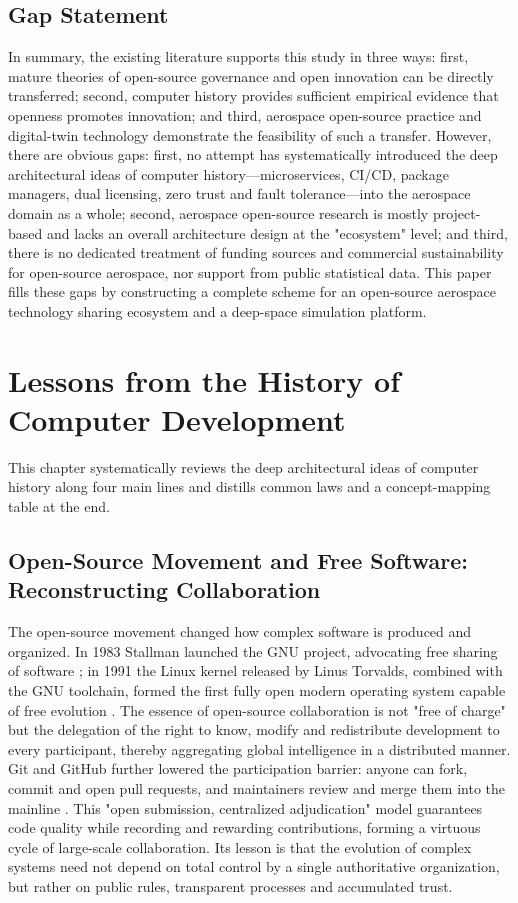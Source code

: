 \documentclass[11pt]{article}
\begin{document}
\subsection{Gap Statement}
In summary, the existing literature supports this study in three ways: first, mature theories of open-source governance and open innovation can be directly transferred; second, computer history provides sufficient empirical evidence that openness promotes innovation; and third, aerospace open-source practice and digital-twin technology demonstrate the feasibility of such a transfer. However, there are obvious gaps: first, no attempt has systematically introduced the deep architectural ideas of computer history---microservices, CI/CD, package managers, dual licensing, zero trust and fault tolerance---into the aerospace domain as a whole; second, aerospace open-source research is mostly project-based and lacks an overall architecture design at the "ecosystem" level; and third, there is no dedicated treatment of funding sources and commercial sustainability for open-source aerospace, nor support from public statistical data. This paper fills these gaps by constructing a complete scheme for an open-source aerospace technology sharing ecosystem and a deep-space simulation platform.

\section{Lessons from the History of Computer Development}
This chapter systematically reviews the deep architectural ideas of computer history along four main lines and distills common laws and a concept-mapping table at the end.

\subsection{Open-Source Movement and Free Software: Reconstructing Collaboration}
The open-source movement changed how complex software is produced and organized. In 1983 Stallman launched the GNU project, advocating free sharing of software \cite{stallman1985}; in 1991 the Linux kernel released by Linus Torvalds, combined with the GNU toolchain, formed the first fully open modern operating system capable of free evolution \cite{raymond1999}. The essence of open-source collaboration is not "free of charge" but the delegation of the right to know, modify and redistribute development to every participant, thereby aggregating global intelligence in a distributed manner. Git and GitHub further lowered the participation barrier: anyone can fork, commit and open pull requests, and maintainers review and merge them into the mainline \cite{git}. This "open submission, centralized adjudication" model guarantees code quality while recording and rewarding contributions, forming a virtuous cycle of large-scale collaboration. Its lesson is that the evolution of complex systems need not depend on total control by a single authoritative organization, but rather on public rules, transparent processes and accumulated trust.
\end{document}
